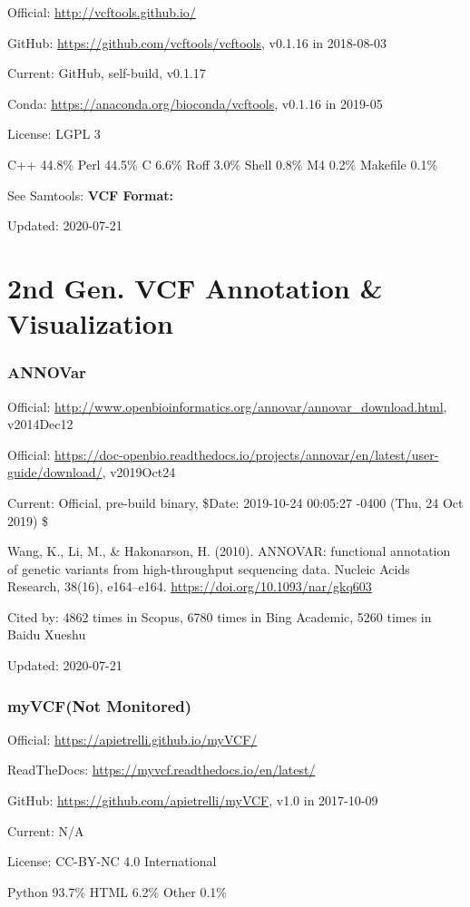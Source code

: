 \documentclass[]{article}
\newcommand{\nm}{{\color{red}(Not Monitored)}}
\newcommand{\cb}[3]{\par Cited by: {\color{blue}\Huge #1} times in Scopus, {\color{blue}\Huge #2} times in Bing Academic, {\color{blue}\Huge #3} times in Baidu Xueshu}
\begin{document}
Official: \url{http://vcftools.github.io/}

GitHub: \url{https://github.com/vcftools/vcftools}, v0.1.16 in 2018-08-03

Current: GitHub, self-build, v0.1.17

Conda: \url{https://anaconda.org/bioconda/vcftools}, v0.1.16 in 2019-05

License: LGPL 3

C++ 44.8\% Perl 44.5\% C 6.6\% Roff 3.0\% Shell 0.8\% M4 0.2\% Makefile 0.1\%

See Samtools: \textbf{VCF Format:}

Updated: 2020-07-21

\part{2nd Gen. VCF Annotation \& Visualization}
\section{ANNOVar}

Official: \url{http://www.openbioinformatics.org/annovar/annovar_download.html}, v2014Dec12

Official: \url{https://doc-openbio.readthedocs.io/projects/annovar/en/latest/user-guide/download/}, v2019Oct24

Current: Official, pre-build binary, \$Date: 2019-10-24 00:05:27 -0400 (Thu, 24 Oct 2019) \$

Wang, K., Li, M., \& Hakonarson, H. (2010). ANNOVAR: functional annotation of genetic variants from high-throughput sequencing data. Nucleic Acids Research, 38(16), e164–e164. \url{https://doi.org/10.1093/nar/gkq603}\cb{4862}{6780}{5260}

Updated: 2020-07-21

\section{myVCF\nm}

Official: \url{https://apietrelli.github.io/myVCF/}

ReadTheDocs: \url{https://myvcf.readthedocs.io/en/latest/}

GitHub: \url{https://github.com/apietrelli/myVCF}, v1.0 in 2017-10-09

Current: N/A

License: CC-BY-NC 4.0 International

Python 93.7\% HTML 6.2\% Other 0.1\%
\end{document}
